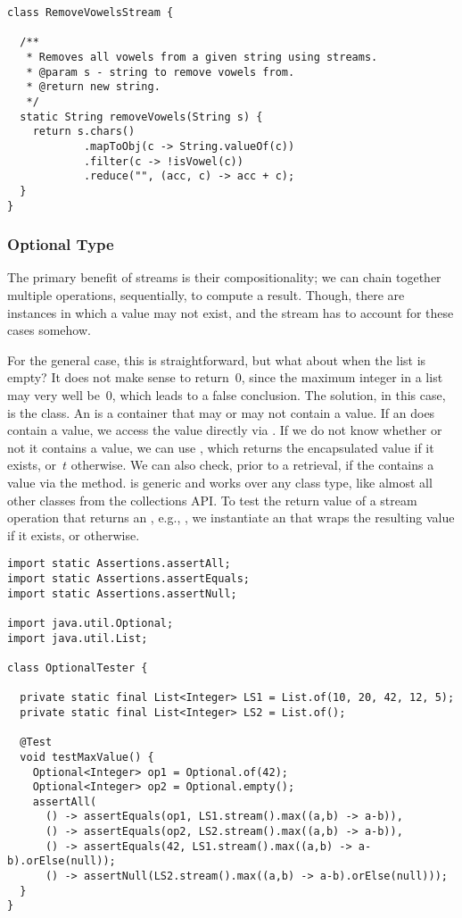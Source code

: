\begin{lstlisting}[language=MyJava]
class RemoveVowelsStream {

  /**
   * Removes all vowels from a given string using streams.
   * @param s - string to remove vowels from.
   * @return new string.
   */
  static String removeVowels(String s) {
    return s.chars()
            .mapToObj(c -> String.valueOf(c))
            .filter(c -> !isVowel(c))
            .reduce("", (acc, c) -> acc + c);
  }
}
\end{lstlisting}

\subsubsection*{Optional Type}
The primary benefit of streams is their compositionality; we can chain together multiple operations, sequentially, to compute a result. 
Though, there are instances in which a value may not exist, and the stream has to account for these cases somehow.

For the general case, this is straightforward, but what about when the list is empty? 
It does not make sense to return~$0$, since the maximum integer in a list may very well be~$0$, which leads to a false conclusion. 
The solution, in this case, is the  class. 
An  is a container that may or may not contain a value. 
If an  does contain a value, we access the value directly via . 
If we do not know whether or not it contains a value, we can use , which returns the encapsulated value if it exists, or~$t$ otherwise. 
We can also check, prior to a retrieval, if the  contains a value via the  method. 
 is generic and works over any class type, like almost all other classes from the collections API. 
To test the return value of a stream operation that returns an , e.g., , we instantiate an  that wraps the resulting value if it exists, or  otherwise.

\begin{lstlisting}[language=MyJava]
import static Assertions.assertAll;
import static Assertions.assertEquals;
import static Assertions.assertNull;

import java.util.Optional;
import java.util.List;

class OptionalTester {

  private static final List<Integer> LS1 = List.of(10, 20, 42, 12, 5);
  private static final List<Integer> LS2 = List.of();

  @Test
  void testMaxValue() {
    Optional<Integer> op1 = Optional.of(42);
    Optional<Integer> op2 = Optional.empty();
    assertAll(
      () -> assertEquals(op1, LS1.stream().max((a,b) -> a-b)),
      () -> assertEquals(op2, LS2.stream().max((a,b) -> a-b)),
      () -> assertEquals(42, LS1.stream().max((a,b) -> a-b).orElse(null));
      () -> assertNull(LS2.stream().max((a,b) -> a-b).orElse(null)));
  }
}
\end{lstlisting}

